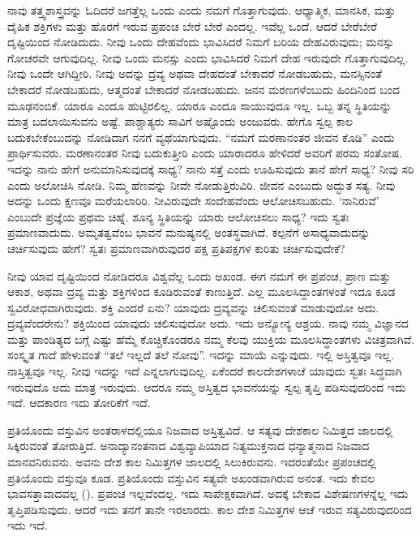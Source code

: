 ನಾವು ತತ್ತ್ವಶಾಸ್ತ್ರವನ್ನು ಓದಿದರೆ ಜಗತ್ತೆಲ್ಲ ಒಂದು ಎಂದು ನಮಗೆ ಗೊತ್ತಾಗುವುದು. ಆಧ್ಯಾತ್ಮಿಕ, ಮಾನಸಿಕ, ಮತ್ತು ದೈಹಿಕ ಶಕ್ತಿಗಳು ಮತ್ತು ಹೊರಗೆ ಇರುವ ಪ್ರಪಂಚ ಬೇರೆ ಬೇರೆ ಎಂದಲ್ಲ. ಇವೆಲ್ಲ ಒಂದೆ. ಆದರೆ ಬೇರೆಬೇರೆ ದೃಷ್ಟಿಯಿಂದ ನೋಡಿದುದು. ನೀವು ಒಂದು ದೇಹವೆಂದು ಭಾವಿಸಿದರೆ ನಿಮಗೆ ಬರಿಯ ದೇಹವಿರುವುದು; ಮನಸ್ಸು ಗೋಚರವೇ ಆಗುವುದಿಲ್ಲ. ನೀವು ಒಂದು ಮನಸ್ಸು ಎಂದು ಭಾವಿಸಿದರೆ ನಿಮಗೆ ದೇಹ ಇರುವುದೇ ಗೊತ್ತಾಗುವುದಿಲ್ಲ. ನೀವು ಒಂದೇ ಆಗಿದ್ದೀರಿ. ನೀವು ಅದನ್ನು ದ್ರವ್ಯ ಅಥವಾ ದೇಹದಂತೆ ಬೇಕಾದರೆ ನೋಡಬಹುದು, ಮನಸ್ಸಿನಂತೆ ಬೇಕಾದರೆ ನೋಡಬಹುದು, ಆತ್ಮದಂತೆ ಬೇಕಾದರೆ ನೋಡಬಹುದು. ಜನನ ಮರಣಗಳೆಂಬುದು ಹಿಂದಿನಿಂದ ಬಂದ ಮೂಢನಂಬಿಕೆ. ಯಾರೂ ಎಂದೂ ಹುಟ್ಟಿರಲಿಲ್ಲ. ಯಾರೂ ಎಂದೂ ಸಾಯುವುದೂ ಇಲ್ಲ. ಒಬ್ಬ ತನ್ನ ಸ್ಥಿತಿಯನ್ನು ಮಾತ್ರ ಬದಲಾಯಿಸುವನು ಅಷ್ಟೆ. ಪಾಶ್ಚಾತ್ಯರು ಸಾವಿಗೆ ಅಷ್ಟೊಂದು ಅಂಜುವರು. ಹೇಗೊ ಸ್ವಲ್ಪ ಕಾಲ ಬದುಕಬೇಕೆಂಬುದನ್ನು ನೋಡಿದಾಗ ನನಗೆ ವ್ಯಥೆಯಾಗುವುದು. “ನಮಗೆ ಮರಣಾನಂತರ ಜೀವನ ಕೊಡಿ'' ಎಂದು ಪ್ರಾರ್ಥಿಸುವರು. ಮರಣಾನಂತರ ನೀವು ಬದುಕುತ್ತೀರಿ ಎಂದು ಯಾರಾದರೂ ಹೇಳಿದರೆ ಅವರಿಗೆ ಪರಮ ಸಂತೋಷ. ಇದನ್ನು ನಾನು ಹೇಗೆ ಅನುಮಾನಿಸುವುದಕ್ಕೆ ಸಾಧ್ಯ? ನಾನು ಸತ್ತೆ ಎಂದು ಊಹಿಸುವುದು ತಾನೆ ಹೇಗೆ ಸಾಧ್ಯ? ನೀವು ಸರಿ ಎಂದು ಅಲೋಚಿಸಿ ನೋಡಿ. ನಿಮ್ಮ ಹೆಣವನ್ನು ನೀವೇ ನೋಡುತ್ತಿರುವಿರಿ. ಜೀವನ ಎಂಬುದು ಅದ್ಭುತ ಸತ್ಯ. ನೀವು ಅದನ್ನು ಒಂದು ಕ್ಷಣವೂ ಮರೆಯಲಾರಿರಿ. ನೀವಿರುವುದೇ ಸಂದೇಹವೆಂದು ಆಲೋಚಿಸಬಹುದು. `ನಾನಿರುವೆ' ಎಂಬುದೇ ಪ್ರಜ್ಞೆಯ ಪ್ರಥಮ ಚಿಹ್ನೆ. ಶೂನ್ಯ ಸ್ಥಿತಿಯನ್ನು ಯಾರು ಆಲೋಚಿಸಲು ಸಾಧ್ಯ? ಇದು ಸ್ವತಃ ಪ್ರಮಾಣವಾದುದು. ಅಮೃತತ್ವವೆಂಬ ಭಾವನೆ ಮನುಷ್ಯನಲ್ಲಿ ಅಂತಸ್ಥವಾಗಿದೆ. ಕಲ್ಪನೆಗೆ ಅಸಾಧ್ಯವಾದುದನ್ನು ಚರ್ಚಿಸುವುದು ಹೇಗೆ? ಸ್ವತಃ ಪ್ರಮಾಣವಾಗಿರುವುದರ ಪಕ್ಷ ಪ್ರತಿಪಕ್ಷಗಳ ಕುರಿತು ಚರ್ಚಿಸುವುದೇಕೆ?

ನೀವು ಯಾವ ದೃಷ್ಟಿಯಿಂದ ನೋಡಿದರೂ ವಿಶ್ವವೆಲ್ಲ ಒಂದು ಅಖಂಡ. ಈಗ ನಮಗೆ ಈ ಪ್ರಪಂಚ, ಪ್ರಾಣ ಮತ್ತು ಆಕಾಶ, ಅಥವಾ ದ್ರವ್ಯ ಮತ್ತು ಶಕ್ತಿಗಳಿಂದ ಕೂಡಿರುವಂತೆ ಕಾಣುತ್ತಿದೆ. ಎಲ್ಲ ಮೂಲಸಿದ್ದಾಂತಗಳಂತೆ ಇದೂ ಕೂಡ ಸ್ವವಿರೋಧವಾಗಿರುವುದು. ಶಕ್ತಿ ಎಂದರೆ ಏನು? ಯಾವುದು ದ್ರವ್ಯವನ್ನು ಚಲಿಸುವಂತೆ ಮಾಡುವುದೋ ಅದು. ದ್ರವ್ಯವೆಂದರೇನು? ಶಕ್ತಿಯಿಂದ ಯಾವುದು ಚಲಿಸುವುದೋ ಅದು. ಇದು ಅನ್ಯೋನ್ಯ ಆಶ್ರಯ. ನಾವು ನಮ್ಮ ವಿಜ್ಞಾನದ ಮತ್ತು ಪಾಂಡಿತ್ಯದ ಬಗ್ಗೆ ಎಷ್ಟು ಹೆಮ್ಮೆ ಕೊಚ್ಚಿಕೊಂಡರೂ ನಮ್ಮ ಕೆಲವು ಯುಕ್ತಿಯ ಮೂಲಸಿದ್ಧಾಂತಗಳು ವಿಚಿತ್ರವಾಗಿವೆ. ಸಂಸ್ಕೃತ ಗಾದೆ ಹೇಳುವಂತೆ “ತಲೆ ಇಲ್ಲದೆ ತಲೆ ನೋವು”. ಇದನ್ನು ಮಾಯೆ ಎನ್ನುವುದು. ಇಲ್ಲಿ ಅಸ್ತಿತ್ವವೂ ಇಲ್ಲ. ನಾಸ್ತಿತ್ವವೂ ಇಲ್ಲ. ನೀವು ಇದನ್ನು ಇದೆ ಎನ್ನಲಾಗುವುದಿಲ್ಲ. ಏಕೆಂದರೆ ಕಾಲದೇಶಗಳಾಚೆ ಯಾವುದು ಸ್ವತಃ ಸಿದ್ಧವಾಗಿ ಇರುವುದೊ ಅದು ಮಾತ್ರ ಇರುವುದು. ಆದರೂ ನಮ್ಮ ಅಸ್ತಿತ್ವದ ಭಾವನೆಯನ್ನು ಸ್ವಲ್ಪ ತೃಪ್ತಿ ಪಡಿಸುವುದರಿಂದ ಇದು ಇದೆ. ಆದಕಾರಣ ಇದು ತೋರಿಕೆಗೆ ಇದೆ.

ಪ್ರತಿಯೊಂದು ವಸ್ತುವಿನ ಅಂತರಾಳದಲ್ಲಿಯೂ ನಿಜವಾದ ಅಸ್ತಿತ್ವವಿದೆ. ಆ ಸತ್ಯವು ದೇಶಕಾಲ ನಿಮಿತ್ತದ ಜಾಲದಲ್ಲಿ ಸಿಕ್ಕಿರುವಂತೆ ತೋರುತ್ತಿದೆ. ಅನಾದ್ಯಾನಂತನಾದ ವಿಶ್ವವ್ಯಾಪಿಯಾದ ನಿತ್ಯಮುಕ್ತನಾದ ಧನ್ಯಾತ್ಮನಾದ ನಿಜವಾದ ಮಾನವನಿರುವನು. ಅವನು ದೇಶ ಕಾಲ ನಿಮಿತ್ತಗಳ ಜಾಲದಲ್ಲಿ ಸಿಲುಕಿರುವನು. ಇದರಂತೆಯೇ ಪ್ರಪಂಚದಲ್ಲಿ ಪ್ರತಿಯೊಂದು ವಸ್ತುವೂ ಕೂಡ. ಪ್ರತಿಯೊಂದು ವಸ್ತುವಿನ ಸತ್ಯವೇ ಅಖಂಡವಾಗಿರುವ ಅನಂತ. ಇದು ಕೇವಲ ಭಾವಸತ್ತಾವಾದವಲ್ಲ (). ಪ್ರಪಂಚ ಇಲ್ಲವೆಂದಲ್ಲ. ಇದು ಸಾಪೇಕ್ಷಕವಾಗಿದೆ. ಅದಕ್ಕೆ ಬೇಕಾದ ವಿಶೇಷಣಗಳನ್ನೆಲ್ಲ ಇದು ತೃಪ್ತಿಪಡಿಸುವುದು. ಆದರೆ ಇದು ತನಗೆ ತಾನೇ ಇರಲಾರದು. ಕಾಲ ದೇಶ ನಿಮಿತ್ತಗಳ ಆಚೆ ಇರುವ ಸತ್ಯವಿರುವುದರಿಂದ ಇದು ಇದೆ.

